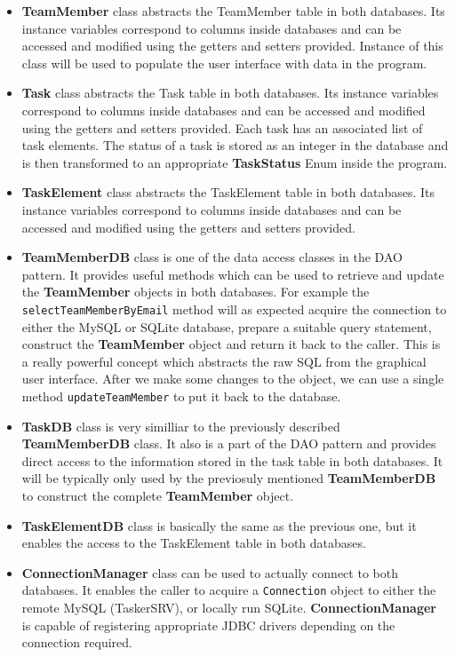 \documentclass{project}
\begin{document}
  \begin{itemize}
  		\item \textbf{TeamMember} class abstracts the TeamMember table in both databases. Its instance variables correspond to columns inside 
  		databases and can be accessed and modified using the getters and setters provided. Instance of this class will be used to populate
  		the user interface with data in the program.
  		\item \textbf{Task} class abstracts the Task table in both databases. Its instance variables correspond to columns inside 
  		databases and can be accessed and modified using the getters and setters provided. Each task has an associated list of task elements. The status of a task is stored as an integer in the database and is then transformed to an appropriate \textbf{TaskStatus} Enum inside the program.
  		\item \textbf{TaskElement} class abstracts the TaskElement table in both databases. Its instance variables correspond to columns inside 
  		databases and can be accessed and modified using the getters and setters provided. 
  		\item \textbf{TeamMemberDB} class is one of the data access classes in the DAO pattern. It provides useful methods which can be used to retrieve and update the \textbf{TeamMember} objects in both databases. For example the \texttt{selectTeamMemberByEmail} method will as expected acquire the connection to either the MySQL or SQLite database, prepare a suitable query statement, construct the \textbf{TeamMember}
  		object and return it back to the caller. This is a really powerful concept which abstracts the raw SQL from the graphical user interface. After we make some changes to the object, we can use a single method \texttt{updateTeamMember} to put it back to the database. 
  		\item \textbf{TaskDB} class is very similliar to the previously described \textbf{TeamMemberDB} class. It also is a part of the DAO pattern and provides direct access to the information stored in the task table in both databases. It will be typically only used by the previosuly mentioned \textbf{TeamMemberDB} to construct the complete \textbf{TeamMember} object.
  		\item \textbf{TaskElementDB} class is basically the same as the previous one, but it enables the access to the TaskElement table in both databases.
  		\item \textbf{ConnectionManager} class can be used to actually connect to both databases. It enables the caller to acquire a \texttt{Connection} object to either the remote MySQL (TaskerSRV), or locally run SQLite. \textbf{ConnectionManager} is capable of registering appropriate JDBC drivers depending on the connection required. 

\end{itemize}
\end{document}
